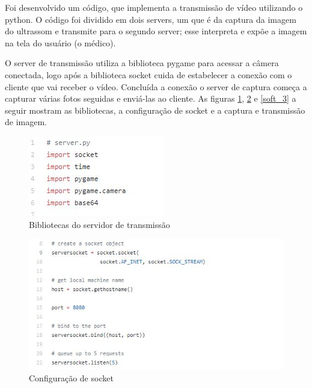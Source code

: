     Foi desenvolvido um código, que implementa a transmissão de vídeo utilizando o python. O código foi dividido em dois servers, um que é da captura da imagem do ultrassom e transmite para o segundo server; esse interpreta e expõe a imagem na tela do usuário (o médico).
    
    O server de transmissão utiliza a biblioteca pygame para acessar a câmera conectada, logo após a biblioteca socket cuida de estabelecer a conexão com o cliente que vai receber o vídeo. Concluída a conexão o server de captura começa a capturar várias fotos seguidas e enviá-las ao cliente. As figuras \ref{soft_1}, \ref{soft_2} e \ref{soft_3} a seguir mostram as bibliotecas, a configuração de socket e a captura e transmissão de imagem.

\begin{figure}[H]
	\centering	\includegraphics[keepaspectratio=true,scale=1]{figuras/2_0_bibliotecas_server_transm.jpg}
	\caption{Bibliotecas do servidor de transmissão}
	\label{soft_1}
\end{figure}

\begin{figure}[H]
	\centering	\includegraphics[keepaspectratio=true,scale=1]{figuras/2_1_socket_server_transm.jpg}
	\caption{Configuração de socket}
	\label{soft_2}
\end{figure}

